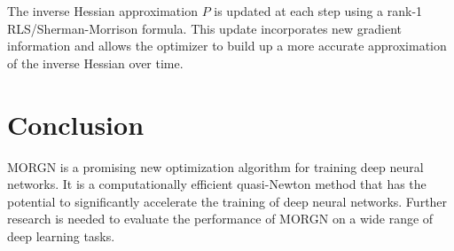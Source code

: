 \documentclass{article}
\begin{document}
The inverse Hessian approximation $P$ is updated at each step using a rank-1 RLS/Sherman-Morrison formula. This update incorporates new gradient information and allows the optimizer to build up a more accurate approximation of the inverse Hessian over time.

\section{Conclusion}

MORGN is a promising new optimization algorithm for training deep neural networks. It is a computationally efficient quasi-Newton method that has the potential to significantly accelerate the training of deep neural networks. Further research is needed to evaluate the performance of MORGN on a wide range of deep learning tasks.
\end{document}
